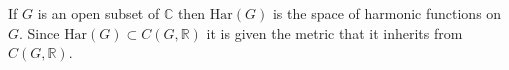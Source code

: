 If $G$ is an open subset of $\mathbb{C}$ then $\text{Har}(G)$ is the space of harmonic functions on $G$. Since $\text{Har}(G) \subset C(G, \mathbb{R})$ it is given the metric that it inherits from $C(G, \mathbb{R})$.
